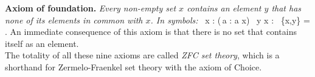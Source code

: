 \textbf{Axiom of foundation.} \emph{Every non-empty set $x$ contains an element $y$ that has none of its elements in common with $x$. In symbols:}
\bse
\forall \, x : (\exists \,a : a \in x) \imp \exists \, y \in x : \bigcap \, \{x,y\} = \vn .
\ese
An immediate consequence of this axiom is that there is no set that contains itself as an element.\\

The totality of all these nine axioms are called \emph{ZFC set theory}, which is a shorthand for Zermelo-Fraenkel set theory with the axiom of Choice.





















